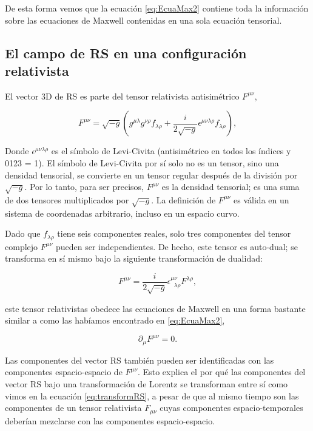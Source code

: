         De esta forma vemos que la ecuación \ref{eq:EcuaMax2} contiene toda la información sobre las ecuaciones de Maxwell contenidas en una sola ecuación tensorial.

        \subsection{El campo de RS en una configuración relativista}

        El vector 3D de RS es parte del tensor relativista antisimétrico $F^{\mu\nu}$,

        \begin{equation}\label{eq:FmunuGeneral}
            F^{\mu\nu} = \sqrt{-g}\left( g^{\mu\lambda}g^{\nu\rho}f_{\lambda\rho} + \frac{i}{2\sqrt{-g}}\epsilon^{\mu\nu\lambda\rho} f_{\lambda\rho} \right),
        \end{equation}

        Donde $\epsilon^{\mu\nu\lambda\rho}$ es el símbolo de Levi-Civita (antisimétrico en todos los índices y 0123 = 1). El símbolo de Levi-Civita por sí solo no es un tensor, sino una densidad tensorial, se convierte en un tensor regular después de la división por $\sqrt{-g}$. Por lo tanto, para ser precisos, $F^{\mu\nu}$ es la densidad tensorial; es una suma de dos tensores multiplicados por $\sqrt{-g}$. La definición de $F^{\mu\nu}$ es válida en un sistema de coordenadas arbitrario, incluso en un espacio curvo.

        
        Dado que $f_{\lambda\rho}$ tiene seis componentes reales, solo tres componentes del tensor complejo $F^{\mu\nu}$ pueden ser independientes. De hecho, este tensor es auto-dual; se transforma en sí mismo bajo la siguiente transformación de dualidad:

        \begin{equation}
            F^{\mu\nu} = \frac{i}{2\sqrt{-g}}\epsilon^{\mu\nu}_{\;\;\lambda\rho}F^{\lambda\rho},
        \end{equation}

        este tensor relativistas obedece las ecuaciones de Maxwell en una forma bastante similar a como las habíamos encontrado en \ref{eq:EcuaMax2},

        \begin{equation}
            \partial_{\mu}F^{\mu\nu} = 0.
        \end{equation}

        Las componentes del vector RS también pueden ser identificadas con las componentes espacio-espacio de $F^{\mu\nu}$. Esto explica el por qué las componentes del vector RS bajo una transformación de Lorentz se transforman entre sí como vimos en la ecuación \ref{eq:transformRS}, a pesar de que al mismo tiempo son las componentes de un tensor relativista $F_{\mu\nu}$ cuyas componentes espacio-temporales deberían mezclarse con las componentes espacio-espacio.

